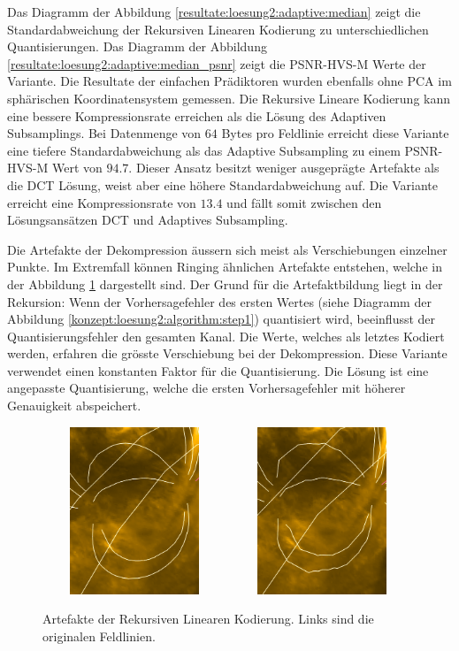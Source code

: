Das Diagramm der Abbildung \ref{resultate:loesung2:adaptive:median} zeigt die Standardabweichung der Rekursiven Linearen Kodierung zu unterschiedlichen Quantisierungen. Das Diagramm der Abbildung \ref{resultate:loesung2:adaptive:median_psnr} zeigt die PSNR-HVS-M Werte der Variante. Die Resultate der einfachen Prädiktoren wurden ebenfalls ohne PCA im sphärischen Koordinatensystem gemessen. Die Rekursive Lineare Kodierung kann eine bessere Kompressionsrate erreichen als die Lösung des Adaptiven Subsamplings. Bei Datenmenge von $64$ Bytes pro Feldlinie erreicht diese Variante eine tiefere Standardabweichung als das Adaptive Subsampling zu einem PSNR-HVS-M Wert von $94.7$. Dieser Ansatz besitzt weniger ausgeprägte Artefakte als die DCT Lösung, weist aber eine höhere Standardabweichung auf. Die Variante erreicht eine Kompressionsrate von $13.4$ und fällt somit zwischen den Lösungsansätzen DCT und Adaptives Subsampling.

Die Artefakte der Dekompression äussern sich meist als Verschiebungen einzelner Punkte. Im Extremfall können Ringing ähnlichen Artefakte entstehen, welche in der Abbildung \ref{resultate:loesung2:adaptive:median:artefakte} dargestellt sind. Der Grund für die Artefaktbildung liegt in der Rekursion: Wenn der Vorhersagefehler des ersten Wertes (siehe Diagramm der Abbildung \ref{konzept:loesung2:algorithm:step1}) quantisiert wird, beeinflusst der Quantisierungsfehler den gesamten Kanal. Die Werte, welches als letztes Kodiert werden, erfahren die grösste Verschiebung bei der Dekompression. Diese Variante verwendet einen konstanten Faktor für die Quantisierung. Die Lösung ist eine angepasste Quantisierung, welche die ersten Vorhersagefehler mit höherer Genauigkeit abspeichert. 

\begin{figure}[!htbp]
	\center
		\includegraphics[width=0.49\textwidth,height=5cm,keepaspectratio]{./pictures/resultate/loesung2/variante3/no_artifacts.png}
	\includegraphics[width=0.49\textwidth,height=5cm,keepaspectratio]{./pictures/resultate/loesung2/variante3/artifacts_8.png}
	\caption{Artefakte der Rekursiven Linearen Kodierung. Links sind die originalen Feldlinien.}
	\label{resultate:loesung2:adaptive:median:artefakte}
\end{figure}

